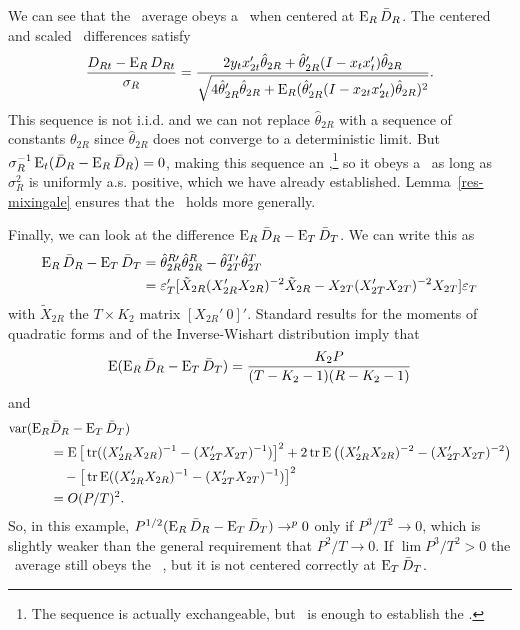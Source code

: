 \documentclass[11pt]{article}
\newcommand{\e}{\varepsilon}
\newcommand{\eb}{\mathbf{\e}}
\begin{document}
We can see that the \oos\ average obeys a \clt\ when centered at $\operatorname{E}_R
\bar{D}_R$.  The centered and scaled \oos\ differences satisfy
\begin{equation*}
  \frac{D_{Rt} - \operatorname{E}_R D_{Rt}}{\sigma_R} =
  \frac{2 y_{t} x_{2t}' \hat{\theta}_{2R} +
    \hat{\theta}_{2R}' (I - x_t x_t') \hat{\theta}_{2R}}{\sqrt{4
    \hat{\theta}_{2R}' \hat{\theta}_{2R} +
    \operatorname{E}_R(\hat{\theta}_{2R}'(I - x_{2t} x_{2t}') \hat{\theta}_{2R})^2}}.
\end{equation*}
This sequence is not i.i.d. and we can not replace $\hat{\theta}_{2R}$
with a sequence of constants $\theta_{2R}$ since $\hat{\theta}_{2R}$
does not converge to a deterministic limit.  But $\sigma_R^{-1}
\operatorname{E}_t(\bar{D}_{R} - \operatorname{E}_R\bar{D}_{R}) = 0$, making this sequence an
\mds,\footnote{The sequence is actually exchangeable, but \mds\ is
  enough to establish the \clt.} so it obeys a \clt\ as long as
$\sigma_R^2$ is uniformly a.s. positive, which we have already
established.  Lemma~\ref{res-mixingale} ensures that the \clt\ holds
more generally.

Finally, we can look at the difference $\operatorname{E}_R \bar{D}_R - \operatorname{E}_T
\bar{D}_T$.  We can write this as
\begin{align*}
  \E_R \oosA - \E_T \oosB &= \hat{\theta}_{2R}^{R\prime}
  \hat{\theta}_{2R}^R - \hat{\theta}_{2T}^{T\prime}
  \hat{\theta}_{2T}^T \\ &=
  \eb_T'[\tilde{X}_{2R}(X_{2R}'X_{2R})^{-2}
  \tilde{X}_{2R} - X_{2T}(X_{2T}'X_{2T})^{-2} X_{2T} ] \eb_T
\end{align*}
with $\tilde{X}_{2R}$ the $T \times K_2$ matrix $[X_{2R}'\ 0]'$.
Standard results for the moments of quadratic forms and of the
Inverse-Wishart distribution \citep{Haf:79} imply that
\begin{equation*}
  \operatorname{E}(\operatorname{E}_R \bar{D}_{R} - \operatorname{E}_T \bar{D}_{T}) = \frac{K_2 P}{(T - K_2 - 1)(R - K_2 - 1)}
\end{equation*}
and
\begin{align*}
  \operatorname{var}(\operatorname{E}_R & \bar{D}_{R} - \operatorname{E}_T \bar{D}_{T}) \\ &= \operatorname{E}
  \big[\operatorname{tr}((X_{2R}'X_{2R})^{-1} - (X_{2T}'X_{2T})^{-1})\big]^2 + 2 \operatorname{tr}
  \operatorname{E}\big((X_{2R}'X_{2R})^{-2} - (X_{2T}'X_{2T})^{-2}\big) \\ &\quad - \big[\operatorname{tr}
  \operatorname{E}((X_{2R}'X_{2R})^{-1} - (X_{2T}'X_{2T})^{-1}) \big]^2 \\ &=
  O(P/T)^2.
\end{align*}
So, in this example, $P^{1/2}(\operatorname{E}_R \bar{D}_{R} - \operatorname{E}_T \bar{D}_{T}) \to^p 0$ only
if $P^3/T^2 \to 0$, which is slightly weaker than the general
requirement that $P^2/T \to 0$.  If $\lim P^3/T^2 > 0$ the \oos\ average
still obeys the \mds\ \clt, but it is not centered correctly at $\operatorname{E}_T
\bar{D}_{T}$.
\end{document}
